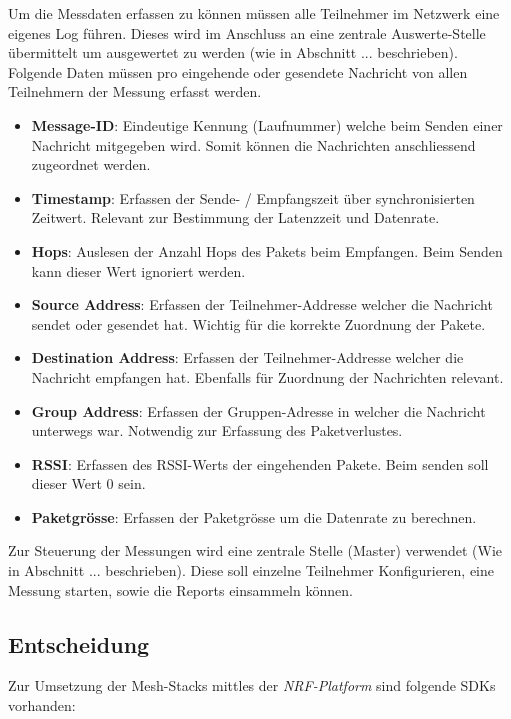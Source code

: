 Um die Messdaten erfassen zu können müssen alle Teilnehmer im Netzwerk eine eigenes Log führen. Dieses wird im Anschluss an eine zentrale Auswerte-Stelle übermittelt um ausgewertet zu werden (wie in Abschnitt ... beschrieben). Folgende Daten müssen pro eingehende oder gesendete Nachricht von allen Teilnehmern der Messung erfasst werden. 

\begin{itemize}
	\item \textbf{Message-ID}: Eindeutige Kennung (Laufnummer) welche beim Senden einer Nachricht mitgegeben wird. Somit können die Nachrichten anschliessend zugeordnet werden. 
	\item \textbf{Timestamp}: Erfassen der Sende- / Empfangszeit über synchronisierten Zeitwert. Relevant zur Bestimmung der Latenzzeit und Datenrate. 
	\item \textbf{Hops}: Auslesen der Anzahl Hops des Pakets beim Empfangen. Beim Senden kann dieser Wert ignoriert werden.
	\item \textbf{Source Address}: Erfassen der Teilnehmer-Addresse welcher die Nachricht sendet oder gesendet hat. Wichtig für die korrekte Zuordnung der Pakete. 
	\item \textbf{Destination Address}: Erfassen der Teilnehmer-Addresse welcher die Nachricht empfangen hat. Ebenfalls für Zuordnung der Nachrichten relevant. 
	\item \textbf{Group Address}: Erfassen der Gruppen-Adresse in welcher die Nachricht unterwegs war. Notwendig zur Erfassung des Paketverlustes. 
	\item \textbf{RSSI}: Erfassen des RSSI-Werts der eingehenden Pakete. Beim senden soll dieser Wert 0 sein. 
	\item \textbf{Paketgrösse}: Erfassen der Paketgrösse um die Datenrate zu berechnen. 
\end{itemize}

Zur Steuerung der Messungen wird eine zentrale Stelle (Master) verwendet (Wie in Abschnitt ... beschrieben). Diese soll einzelne Teilnehmer Konfigurieren, eine Messung starten, sowie die Reports  einsammeln können. 




\subsection{Entscheidung}\label{subsec:Software_Entscheidung}

Zur Umsetzung der Mesh-Stacks mittles der \textit{NRF-Platform} sind folgende SDKs vorhanden: 

